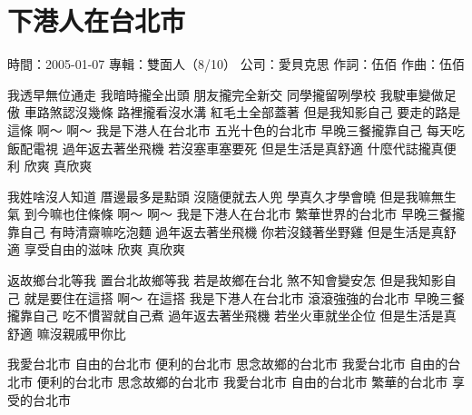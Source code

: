 \documentclass[UTF8,a4paper,oneside,twocolumn,12pt]{ctexbook}
\newcommand{\infopair}[2]{\textbullet #1：#2}
\newcommand{\zc}[1][伍佰]{\infopair{作詞}{#1}}
\newcommand{\zq}[1][伍佰]{\infopair{作曲}{#1}}
\newcommand{\zj}[1]{\infopair{專輯}{#1}}
\newcommand{\sj}[1]{\infopair{時間}{#1}}
\newcommand{\gs}[1]{\infopair{公司}{#1}}
\newenvironment{info}{\begin{flushleft}\kaishu
	}
	{\end{flushleft}\normalsize\yahei\par}
\newenvironment{lyric}{
	}
{}
\begin{document}
\section{下港人在台北市}
\begin{info}
	\sj{2005-01-07}
	\zj{雙面人（8/10）}
	\gs{愛貝克思}
	\zc
	\zq
\end{info}
\begin{lyric}
	我透早無位通走 我暗時攏全出頭
	朋友攏完全新交 同學攏留咧學校
	我駛車變做足傲 車路煞認沒幾條
	路裡攏看沒水溝 紅毛土全部蓋著
	但是我知影自己 要走的路是這條 啊～ 啊～
	我是下港人在台北市 五光十色的台北市
	早晚三餐攏靠自己 每天吃飯配電視
	過年返去著坐飛機 若沒塞車塞要死
	但是生活是真舒適 什麼代誌攏真便利
	欣爽 真欣爽

	我姓啥沒人知道 厝邊最多是點頭
	沒隨便就去人兜 學真久才學會曉
	但是我嘛無生氣 到今嘛也住條條 啊～ 啊～
	我是下港人在台北市 繁華世界的台北市
	早晚三餐攏靠自己 有時清齋嘛吃泡麵
	過年返去著坐飛機 你若沒錢著坐野雞
	但是生活是真舒適 享受自由的滋味
	欣爽 真欣爽

	返故鄉台北等我 置台北故鄉等我
	若是故鄉在台北 煞不知會變安怎
	但是我知影自己 就是要住在這搭 啊～ 在這搭
	我是下港人在台北市 滾滾強強的台北市
	早晚三餐攏靠自己 吃不慣習就自己煮
	過年返去著坐飛機 若坐火車就坐企位
	但是生活是真舒適 嘛沒親戚甲你比

	我愛台北市 自由的台北市
	便利的台北市 思念故鄉的台北市
	我愛台北市 自由的台北市
	便利的台北市 思念故鄉的台北市
	我愛台北市 自由的台北市
	繁華的台北市 享受的台北市
\end{lyric}
\end{document}
